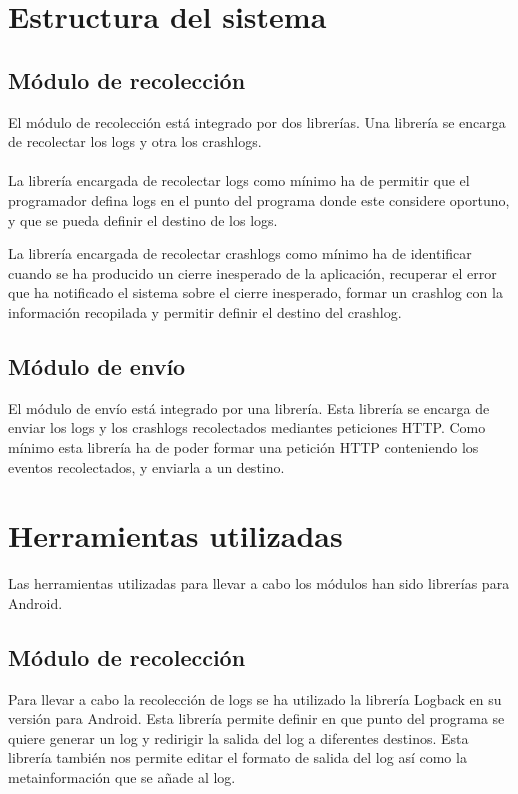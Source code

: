 \section{Estructura del sistema}

\subsection{Módulo de recolección}
El módulo de recolección está integrado por dos librerías. Una librería se encarga de recolectar los logs y otra los crashlogs.
\\\\
La librería encargada de recolectar logs como mínimo ha de permitir que el programador defina logs en el punto del programa donde este considere oportuno, y que se pueda definir el destino de los logs.

La librería encargada de recolectar crashlogs como mínimo ha de identificar cuando se ha producido un cierre inesperado de la aplicación, recuperar el error que ha notificado el sistema sobre el cierre inesperado, formar un crashlog con la información recopilada y permitir definir el destino del crashlog.

\subsection{Módulo de envío}
El módulo de envío está integrado por una librería. Esta librería se encarga de enviar los logs y los crashlogs recolectados mediantes peticiones HTTP. Como mínimo esta librería ha de poder formar una petición HTTP conteniendo los eventos recolectados, y enviarla a un destino.

\section{Herramientas utilizadas}

Las herramientas utilizadas para llevar a cabo los módulos han sido librerías para Android.

\subsection{Módulo de recolección}
Para llevar a cabo la recolección de logs se ha utilizado la librería Logback\cite{Tfg:logbackandroid} en su versión para Android. Esta librería permite definir en que punto del programa se quiere generar un log y redirigir la salida del log a diferentes destinos. Esta librería también nos permite editar el formato de salida del log así como la metainformación que se añade al log.

